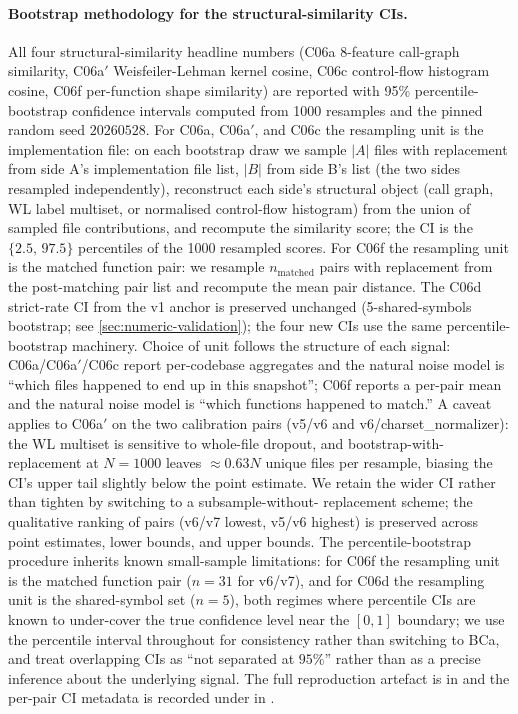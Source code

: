 \documentclass[11pt,letterpaper]{article}
\begin{document}
\paragraph{Bootstrap methodology for the structural-similarity CIs.}
All four structural-similarity headline numbers (C06a 8-feature
call-graph similarity, C06a$'$ Weisfeiler-Lehman kernel cosine,
C06c control-flow histogram cosine, C06f per-function shape
similarity) are reported with 95\% percentile-bootstrap confidence
intervals computed from 1000 resamples and the pinned random seed
$20260528$. For C06a, C06a$'$, and C06c the resampling unit is
the implementation file: on each bootstrap draw we sample $|A|$
files with replacement from side A's implementation file list,
$|B|$ from side B's list (the two sides resampled independently),
reconstruct each side's structural object (call graph, WL label
multiset, or normalised control-flow histogram) from the union of
sampled file contributions, and recompute the similarity score;
the CI is the $\{2.5,\,97.5\}$ percentiles of the 1000 resampled
scores. For C06f the resampling unit is the matched function
pair: we resample $n_{\mathrm{matched}}$ pairs with replacement
from the post-matching pair list and recompute the mean pair
distance. The C06d strict-rate CI from the v1 anchor is preserved
unchanged (5-shared-symbols bootstrap; see
\cref{sec:numeric-validation}); the four new CIs use the same
percentile-bootstrap machinery. Choice of unit follows the
structure of each signal: C06a/C06a$'$/C06c report per-codebase
aggregates and the natural noise model is ``which files happened
to end up in this snapshot''; C06f reports a per-pair mean and
the natural noise model is ``which functions happened to match.''
A caveat applies to C06a$'$ on the two calibration pairs
(v5/v6 and v6/charset\_normalizer): the WL multiset is sensitive
to whole-file dropout, and bootstrap-with-replacement at $N{=}1000$
leaves $\approx 0.63N$ unique files per resample, biasing the
CI's upper tail slightly below the point estimate. We retain the
wider CI rather than tighten by switching to a subsample-without-
replacement scheme; the qualitative ranking of pairs (v6/v7
lowest, v5/v6 highest) is preserved across point estimates, lower
bounds, and upper bounds. The percentile-bootstrap procedure
inherits known small-sample limitations: for C06f the resampling
unit is the matched function pair ($n{=}31$ for v6/v7), and for
C06d the resampling unit is the shared-symbol set ($n{=}5$), both
regimes where percentile CIs are known to under-cover the true
confidence level near the $[0,1]$ boundary; we use the percentile
interval throughout for consistency rather than switching to BCa,
and treat overlapping CIs as ``not separated at $95\%$'' rather
than as a precise inference about the underlying signal. The
full reproduction artefact is in
and the per-pair CI metadata is recorded under
 in
.
\end{document}
